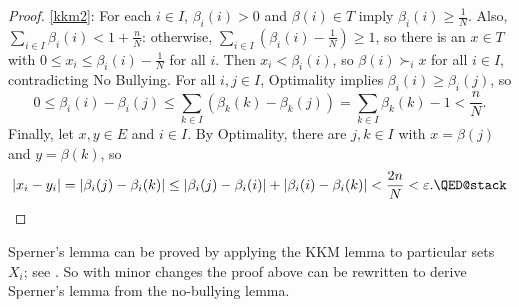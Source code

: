 \documentclass[english, 11pt]{article}
\theoremstyle{plain} %
\theoremstyle{definition}
\begin{document}
\begin{proof}
\ref{kkm2}: For each $i \in I$, $\beta_i(i) > 0$ and $\beta(i) \in T$ imply $\beta_i(i) \geq \frac{1}{N}$. Also, $\sum_{i \in I} \beta_i(i) < 1 + \frac{n}{N}$: otherwise, $\sum_{i \in I} \left(\beta_i(i) - \frac{1}{N}\right) \geq 1$, so there is an $x \in T$ with $0 \leq x_i \leq \beta_i(i) - \frac{1}{N}$ for all $i$. Then $x_i < \beta_i(i)$, so $\beta(i) \succ_i x$ for all $i \in I$, contradicting No Bullying. For all $i, j \in I$, Optimality implies $\beta_i(i) \geq \beta_i(j)$, so
\[
0 \leq \beta_i(i) - \beta_i(j) \leq \sum_{k \in I} \left(\beta_k(k) - \beta_k(j)\right) = \sum_{k \in I} \beta_k(k) - 1 < \frac{n}{N}.
\]
Finally, let $x, y \in E$ and $i \in I$. By Optimality, there are $j, k \in I$ with $x = \beta(j)$ and $y = \beta(k)$, so
\[
\lvert x_i - y_i \rvert = \lvert \beta_i(j) - \beta_i(k) \rvert \leq \lvert \beta_i(j) - \beta_i(i) \rvert + \lvert \beta_i(i) - \beta_i(k) \rvert < \frac{2n}{N} < \varepsilon. \qedhere
\]
\end{proof}

Sperner's lemma can be proved by applying the KKM lemma to particular sets $X_i$; see \cite{Voorneveld2017}. So with minor changes the proof above can be rewritten to derive Sperner's lemma from the no-bullying lemma.



\end{document}
